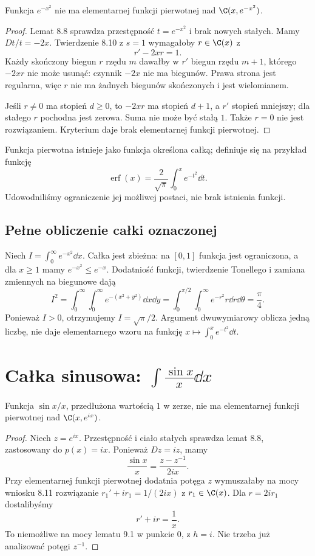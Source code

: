 \begin{twierdzenie}
Funkcja $e^{-x^2}$ nie ma elementarnej funkcji pierwotnej nad $\C(x,e^{-x^2})$.
\end{twierdzenie}
\begin{proof}
Lemat 8.8 sprawdza przestępność $t=e^{-x^2}$ i brak nowych stałych. Mamy $Dt/t=-2x$. Twierdzenie 8.10 z $s=1$ wymagałoby $r\in\C(x)$ z
\[
r'-2xr=1.
\]
Każdy skończony biegun $r$ rzędu $m$ dawałby w $r'$ biegun rzędu $m+1$, którego $-2xr$ nie może usunąć: czynnik $-2x$ nie ma biegunów. Prawa strona jest regularna, więc $r$ nie ma żadnych biegunów skończonych i jest wielomianem.

Jeśli $r\ne0$ ma stopień $d\ge0$, to $-2xr$ ma stopień $d+1$, a $r'$ stopień mniejszy; dla stałego $r$ pochodna jest zerowa. Suma nie może być stałą $1$. Także $r=0$ nie jest rozwiązaniem. Kryterium daje brak elementarnej funkcji pierwotnej.
\end{proof}

Funkcja pierwotna istnieje jako funkcja określona całką; definiuje się na przykład funkcję
\[
\operatorname{erf}(x)=\frac{2}{\sqrt\pi}\int_0^x e^{-t^2}\dd t.
\]
Udowodniliśmy ograniczenie jej możliwej postaci, nie brak istnienia funkcji.

\subsection{Pełne obliczenie całki oznaczonej}

Niech $I=\int_0^\infty e^{-x^2}\dd x$. Całka jest zbieżna: na $[0,1]$ funkcja jest ograniczona, a dla $x\ge1$ mamy $e^{-x^2}\le e^{-x}$. Dodatniość funkcji, twierdzenie Tonellego i zamiana zmiennych na biegunowe dają
\[
I^2=\int_0^\infty\int_0^\infty e^{-(x^2+y^2)}\dd x\dd y
=\int_0^{\pi/2}\int_0^\infty e^{-r^2}r\dd r\dd\theta
=\frac\pi4.
\]
Ponieważ $I>0$, otrzymujemy $I=\sqrt\pi/2$. Argument dwuwymiarowy oblicza jedną liczbę, nie daje elementarnego wzoru na funkcję $x\mapsto\int_0^x e^{-t^2}\dd t$.

\section{Całka sinusowa: $\int \frac{\sin x}{x}\dd x$}

\begin{twierdzenie}
Funkcja $\sin x/x$, przedłużona wartością $1$ w zerze, nie ma elementarnej funkcji pierwotnej nad $\C(x,e^{ix})$.
\end{twierdzenie}
\begin{proof}
Niech $z=e^{ix}$. Przestępność i ciało stałych sprawdza lemat 8.8, zastosowany do $p(x)=ix$. Ponieważ $Dz=iz$, mamy
\[
\frac{\sin x}{x}=\frac{z-z^{-1}}{2ix}.
\]
Przy elementarnej funkcji pierwotnej dodatnia potęga $z$ wymuszałaby na mocy wniosku 8.11 rozwiązanie $r_1'+ir_1=1/(2ix)$ z $r_1\in\C(x)$. Dla $r=2ir_1$ dostalibyśmy
\[
r'+ir=\frac1x.
\]
To niemożliwe na mocy lematu 9.1 w punkcie $0$, z $h=i$. Nie trzeba już analizować potęgi $z^{-1}$.
\end{proof}

